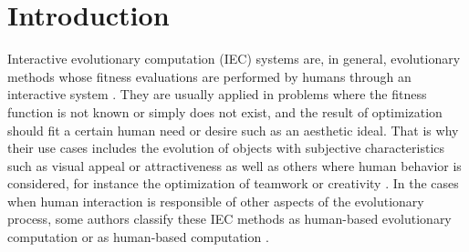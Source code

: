 \section{Introduction}




Interactive evolutionary computation (IEC) systems are, in general, evolutionary methods
whose fitness evaluations are performed by humans through an interactive 
system \cite{eiben2015interactive}.
They are usually applied in problems where the fitness function is not known or simply
does not exist, and the result of optimization should fit a certain human need or
desire such as an aesthetic ideal.  
That is why their use cases includes the evolution of objects with subjective characteristics
such as visual appeal or attractiveness \cite{biomorphs} as well as others where human behavior is 
considered, for instance the optimization of teamwork \cite{kosorukoff2002evolutionary}
or creativity \cite{yu2011cooks}. In the cases when 
human interaction is responsible of other 
aspects of the evolutionary process, some authors classify these IEC methods 
as human-based evolutionary computation \cite{kosorukoff2001human} 
or as human-based computation \cite{quinn2011human}.

